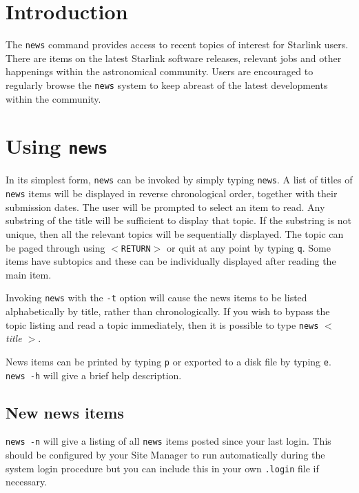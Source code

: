 \documentclass[11pt,nolof,noabs]{starlink}
\begin{document}
\scfrontmatter


\section{Introduction}

The \texttt{news} command provides access to recent topics of interest for
Starlink users.  There are items on the latest Starlink software
releases, relevant jobs and other happenings within the astronomical
community.  Users are encouraged to regularly browse the \texttt{news}
system to keep abreast of the latest developments within the
community.

\section{Using \texttt{news}}

In its simplest form, \texttt{news} can be invoked by simply typing \texttt{news}.
 A list of titles of \texttt{news} items will be displayed in
reverse chronological order, together with their submission dates.  The
user will be prompted to select an item to read.  Any substring of the
title will be sufficient to display that topic.  If the substring is not
unique, then all the relevant topics will be sequentially displayed.
The topic can be paged through using \texttt{$<$RETURN$>$} or quit  at any
point by typing \texttt{q}.  Some items have subtopics and these can be
individually displayed after reading the main item.

Invoking \texttt{news} with the \texttt{-t} option will cause the news items
to be listed alphabetically by title, rather than chronologically.  If
you wish to bypass the topic listing and read a topic immediately,
then it is possible to type \texttt{news} \textit{$<$ title $>$}.

News items can be printed by typing \texttt{p} or exported to a disk
file by typing \texttt{e}. \texttt{news -h} will give a brief help description.

\subsection{New news items}

\texttt{news -n} will give a listing of all \texttt{news} items posted since
your last login.  This should be configured by your Site Manager to run
automatically during the system login procedure but you can include
this in your own \texttt{.login} file if necessary.
\end{document}
